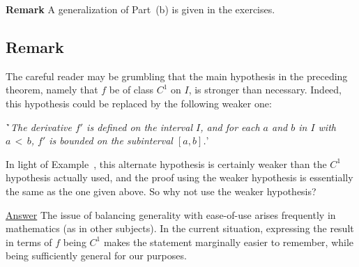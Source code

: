         {\bf Remark} A generalization of Part~(b) is given in the exercises.

\V
\V

             \subsection{\small{\bf Remark}}
            \label{RemrkE55.50}

\V

        The careful reader may be grumbling that the main hypothesis in the preceding theorem, namely that $f$ be of class $C^{1}$ on $I$,
    is stronger than necessary.
    Indeed, this hypothesis could be replaced by the following weaker one:


    \h `{\em The derivative $f'$ is defined on the interval $I$, and for each $a$ and $b$ in $I$ with $a\,<\,b$, $f'$ is bounded on the subinterval $[a,b]$.}'

\noindent In light of Example~, this alternate hypothesis is certainly weaker than the $C^{1}$ hypothesis actually used,
    and the proof using the weaker hypothesis is essentially the same as the one given above.
    So why not use the weaker hypothesis?

        \underline{Answer} The issue of balancing generality with ease-of-use arises frequently in mathematics (as in other subjects).
    In the current situation, expressing the result in terms of $f$ being $C^{1}$ makes the statement marginally easier to remember, while being sufficiently general for our purposes.


